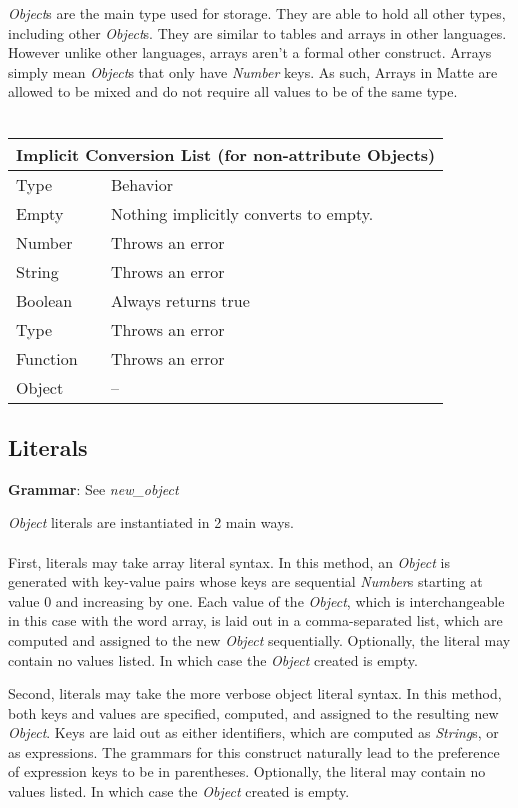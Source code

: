 \documentclass[12pt,letterpaper]{report}
\begin{document}
\textit{Object}s are the main type used for storage. They are able to hold all other types, including 
other \textit{Object}s. They are similar to tables and arrays in other languages. However
unlike other languages, arrays aren't a formal other construct. Arrays simply mean 
\textit{Object}s that only have \textit{Number} keys. As such, Arrays in Matte are allowed to be 
mixed and do not require all values to be of the same type.
\\\\
{
\centering
\begin{tabular}{ |p{2.5cm}||p{10cm}|  }
  \hline
  \multicolumn{2}{|c|}{Implicit Conversion List (for non-attribute Objects)} \\
  \hline
  Type & Behavior\\
  \hline
  Empty & Nothing implicitly converts to empty.\\
  Number  & Throws an error \\
  String & Throws an error\\
  Boolean & Always returns true \\
  Type & Throws an error\\
  Function & Throws an error\\
  Object & --\\
 \hline
\end{tabular}
}
\subsection{Literals}\label{Literals}

\textbf{Grammar}: See \textit{new\_object}


\textit{Object} literals are instantiated in 2 main ways.
\\\\
First, literals may take array literal syntax. In this method, an \textit{Object} is generated with 
key-value pairs whose keys are sequential \textit{Number}s starting at value 0 and increasing by one.
Each value of the \textit{Object}, which is interchangeable in this case with the word array,
is laid out in a comma-separated list, which are computed and assigned to the new \textit{Object} sequentially.
Optionally, the literal may contain no values listed. In which case the \textit{Object} created is empty.



Second, literals may take the more verbose object literal syntax. In this method, both 
keys and values are specified, computed, and assigned to the resulting new \textit{Object}.
Keys are laid out as either identifiers, which are computed as \textit{String}s, or 
as expressions. The grammars for this construct naturally lead to the preference of 
expression keys to be in parentheses.
Optionally, the literal may contain no values listed. In which case the \textit{Object} created is empty.
\end{document}
